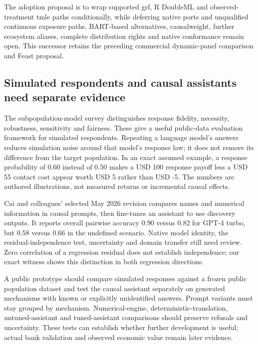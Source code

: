 The adoption proposal is to wrap supported grf, R DoubleML and
observed-treatment tmle paths conditionally, while deferring native
ports and unqualified continuous exposure paths. BART-based
alternatives, causalweight, further ecosystem aliases, complete
distribution rights and native conformance remain open. This successor
retains the preceding commercial dynamic-panel comparison and Feast
proposal. \citep{sp19dyn_reader,sp19dyn_progress}

\hypertarget{simulated-respondents-and-causal-assistants-need-separate-evidence}{%
\subsection{Simulated respondents and causal assistants need separate
evidence}\label{simulated-respondents-and-causal-assistants-need-separate-evidence}}

The subpopulation-model survey distinguishes response fidelity,
necessity, robustness, sensitivity and fairness. These give a useful
public-data evaluation framework for simulated respondents. Repeating a
language model's answers reduces simulation noise around that model's
response law; it does not remove its difference from the target
population. In an exact assumed example, a response probability of 0.60
instead of 0.50 makes a USD 100 response payoff less a USD 55 contact
cost appear worth USD 5 rather than USD -5. The numbers are authored
illustrations, not measured returns or incremental causal effects.
\citep{exec20_population,exec20_population_attribution_reference}

Cai and colleagues' selected May 2026 revision compares names and
numerical information in causal prompts, then fine-tunes an assistant to
use discovery outputs. It reports overall pairwise accuracy 0.90 versus
0.82 for GPT-4 turbo, but 0.58 versus 0.66 in the undefined scenario.
Native model identity, the residual-independence test, uncertainty and
domain transfer still need review. Zero correlation of a regression
residual does not establish independence; our exact witness shows this
distinction in both regression directions.
\citep{exec20_attribution,exec20_population_attribution_reference}

A public prototype should compare simulated responses against a frozen
public population dataset and test the causal assistant separately on
generated mechanisms with known or explicitly unidentified answers.
Prompt variants must stay grouped by mechanism. Numerical-engine,
deterministic-translation, untuned-assistant and tuned-assistant
comparisons should preserve refusals and uncertainty. These tests can
establish whether further development is useful; actual bank validation
and observed economic value remain later evidence.


